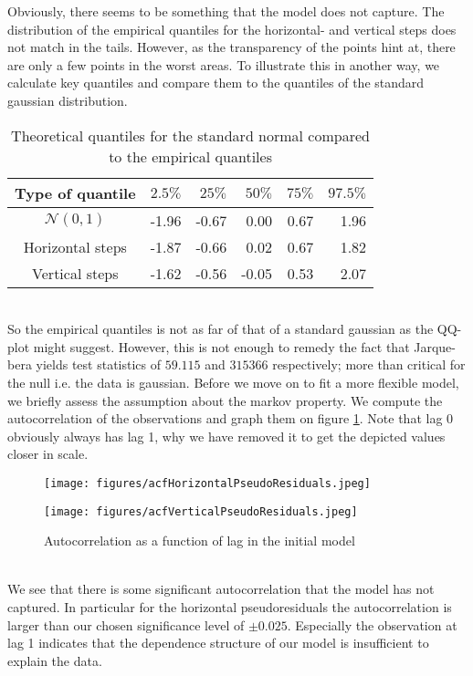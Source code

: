 Obviously, there seems to be something that the model does not capture. The distribution of the empirical quantiles for the horizontal- and vertical steps does not match in the tails. However, as the transparency of the points hint at, there are only a few points in the worst areas. To illustrate this in another way, we calculate key quantiles and compare them to the quantiles of the standard gaussian distribution.
\begin{table}[ht]
    \centering
    \begin{tabular}{crrrrr}
      \hline
     Type of quantile & $2.5\%$ & $25\%$ & $50\%$ & $75\%$ & $97.5\%$ \\ 
     \hline
     $\mathcal{N}(0,1)$ & -1.96 & -0.67 & 0.00 & 0.67 & 1.96 \\ 
     Horizontal steps & -1.87 & -0.66 & 0.02 & 0.67 & 1.82 \\ 
     Vertical steps & -1.62 & -0.56 & -0.05 & 0.53 & 2.07 \\ 
        \hline
    \end{tabular}
    \caption{Theoretical quantiles for the standard normal compared to the empirical quantiles}
\end{table}\\
So the empirical quantiles is not as far of that of a standard gaussian as the QQ-plot might suggest. However, this is not enough to remedy the fact that Jarque-bera \cite{tseries} yields test statistics of $59.115$ and $315366$ respectively; more than critical for the null i.e. the data is gaussian. Before we move on to fit a more flexible model, we briefly assess the assumption about the markov property. We compute the autocorrelation of the observations and graph them on figure \ref{combinedACFPlots}. Note that lag 0 obviously always has lag 1, why we have removed it to get the depicted values closer in scale.
\begin{figure}[ht]
  \centering
  \begin{minipage}[b]{0.34\textwidth}
    \texttt{[image: figures/acfHorizontalPseudoResiduals.jpeg]}
  \end{minipage}
  \hspace{0.175\textwidth}
  \begin{minipage}[b]{0.34\textwidth}
    \texttt{[image: figures/acfVerticalPseudoResiduals.jpeg]}
  \end{minipage}
  \caption{Autocorrelation as a function of lag in the initial model}
  \label{combinedACFPlots}
\end{figure}\\
We see that there is some significant autocorrelation that the model has not captured. In particular for the horizontal pseudoresiduals the autocorrelation is larger than our chosen significance level of $\pm 0.025$. Especially the observation at lag 1 indicates that the dependence structure of our model is insufficient to explain the data.
\newpage
